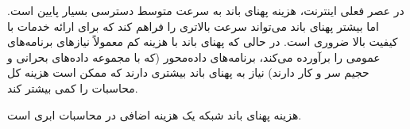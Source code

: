 \documentclass{book}
\begin{document}
        در عصر فعلی اینترنت، هزینه پهنای باند به سرعت متوسط دسترسی بسیار پایین است. اما بیشتر پهنای باند می‌تواند سرعت بالاتری را فراهم کند که برای ارائه خدمات با کیفیت بالا ضروری است. در حالی که پهنای باند با هزینه کم معمولاً نیازهای برنامه‌های عمومی را برآورده می‌کند، برنامه‌های داده‌محور (که با مجموعه داده‌های بحرانی و حجیم سر و کار دارند) نیاز به پهنای باند بیشتری دارند که ممکن است هزینه کل محاسبات را کمی بیشتر کند.

        \begin{addinfo}
            
            هزینه پهنای باند شبکه یک هزینه اضافی در محاسبات ابری است.
            
        \end{addinfo}
        
\end{document}
